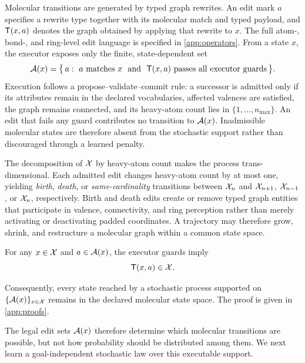 Molecular transitions are generated by typed graph rewrites. An edit mark $a$ specifies a rewrite type together with its molecular match and typed payload, and $\mathsf{T}(x,a)$ denotes the graph obtained by applying that rewrite to $x$. The full atom-, bond-, and ring-level edit language is specified in \cref{app:operators}. From a state $x$, the executor exposes only the finite, state-dependent set
\begin{equation}
\A(x)=\bigl\{\,a:\ a\ \text{matches}\ x\ \ \text{and}\ \ \T(x,a)\ \text{passes all executor guards}\,\bigr\}.
\label{eq:editset}
\end{equation}
Execution follows a propose--validate--commit rule: a successor is admitted only if its attributes remain in the declared vocabularies, affected valences are satisfied, the graph remains connected, and its heavy-atom count lies in $\{1,\dots,n_{\max}\}$. An edit that fails any guard contributes no transition to $\mathcal{A}(x)$. Inadmissible molecular states are therefore absent from the stochastic support rather than discouraged through a learned penalty.

The decomposition of $\mathcal{X}$ by heavy-atom count makes the process trans-dimensional. Each admitted edit changes heavy-atom count by at most one, yielding \emph{birth}, \emph{death}, or \emph{same-cardinality} transitions between $\mathcal{X}_n$ and $\mathcal{X}_{n+1}$, $\mathcal{X}_{n-1}$, or $\mathcal{X}_n$, respectively. Birth and death edits create or remove typed graph entities that participate in valence, connectivity, and ring perception rather than merely activating or deactivating padded coordinates. A trajectory may therefore grow, shrink, and restructure a molecular graph within a common state space.

\begin{proposition}
\label{prop:closure}
For any $x\in\mathcal{X}$ and $a\in\mathcal{A}(x)$, the executor guards imply
\begin{equation*}
\mathsf{T}(x,a)\in\mathcal{X}.
\end{equation*}
\end{proposition}

Consequently, every state reached by a stochastic process supported on $\{\mathcal{A}(x)\}_{x\in\mathcal{X}}$ remains in the declared molecular state space. The proof is given in \cref{app:proofs}.

The legal edit sets $\mathcal{A}(x)$ therefore determine which molecular transitions are possible, but not how probability should be distributed among them. We next learn a goal-independent stochastic law over this executable support.

